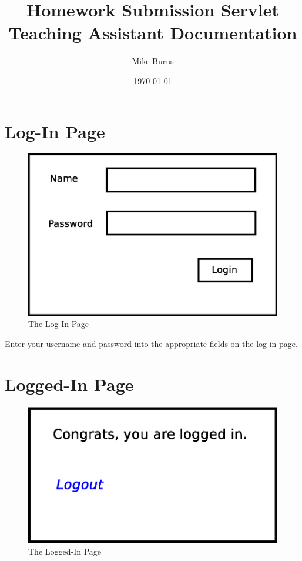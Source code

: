 \documentclass{article}
\begin{document}
\title{Homework Submission Servlet Teaching Assistant Documentation}
\author{Mike Burns}
\date{\today}

\maketitle

\section{Log-In Page}\label{sec:login}

\begin{figure}[h]
\centering
\includegraphics[scale=.35]{login.eps}
\caption{The Log-In Page}
\label{fig:login}
\end{figure}

Enter your username and password into the appropriate fields on the log-in
page.

\section{Logged-In Page}\label{sec:logged-in}

\begin{figure}[h]
\centering
\includegraphics[scale=.35]{logged-in.eps}
\caption{The Logged-In Page}
\label{fig:logged-in}
\end{figure}
\end{document}
